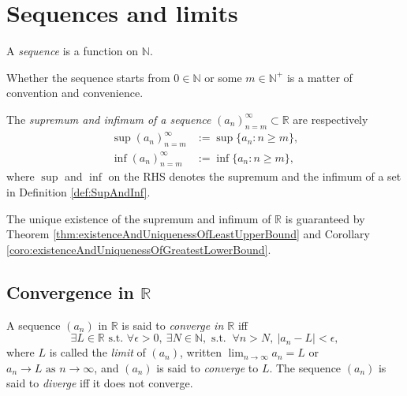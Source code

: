 
\section{Sequences and limits}
\label{sec:sequences}

\begin{defn}
  A \emph{sequence} is a function on $\mathbb{N}$.
\end{defn}

\begin{rem}
  Whether the sequence starts from $0\in\mathbb{N}$
  or some $m\in \mathbb{N}^+$
  is a matter of convention and convenience.
\end{rem}

\begin{defn}
  The \emph{supremum and infimum of a sequence}
  $(a_n)_{n=m}^{\infty}\subset \mathbb{R}$ are respectively 
  \begin{align}
    \label{eq:supSequence}
    \sup(a_n)_{n=m}^{\infty}
    &:= \sup \{a_n: n\ge m\},
    \\
    \label{eq:infSequence}
    \inf(a_n)_{n=m}^{\infty}
    &:= \inf \{a_n: n\ge m\},
  \end{align}
  where $\sup$ and $\inf$ on the RHS
  denotes the supremum and the infimum of a set
  in Definition \ref{def:SupAndInf}. 
\end{defn}

\begin{rem}
  The unique existence of the supremum and infimum of $\mathbb{R}$
  is guaranteed by Theorem \ref{thm:existenceAndUniquenessOfLeastUpperBound}
  and Corollary \ref{coro:existenceAndUniquenessOfGreatestLowerBound}.
\end{rem}


\subsection{Convergence in $\mathbb{R}$}
\label{sec:convergenceOfSequenceInR}

\begin{defn}
  \label{def:limitOfSequence}
  A sequence $(a_n)$ in $\mathbb{R}$
  is said to \emph{converge in $\mathbb{R}$} iff
  \begin{equation}
    \label{eq:limitOfSequence}
    \exists L\in \mathbb{R} \text{ s.t. }  
    \forall \epsilon>0,\ \exists N\in \mathbb{N}, \text{ s.t. }\ 
    \forall n>N, \ |a_n-L| < \epsilon, 
  \end{equation}
  where $L$ is called the \emph{limit} of $(a_n)$, 
  written $\lim_{n\rightarrow \infty} a_n = L$
  or 
  \mbox{$a_n\rightarrow L \text{ as } n\rightarrow\infty$}, 
  and $(a_n)$ is said to \emph{converge} to $L$.
  The sequence $(a_n)$ is said to \emph{diverge}
  iff it does not converge.
\end{defn}

